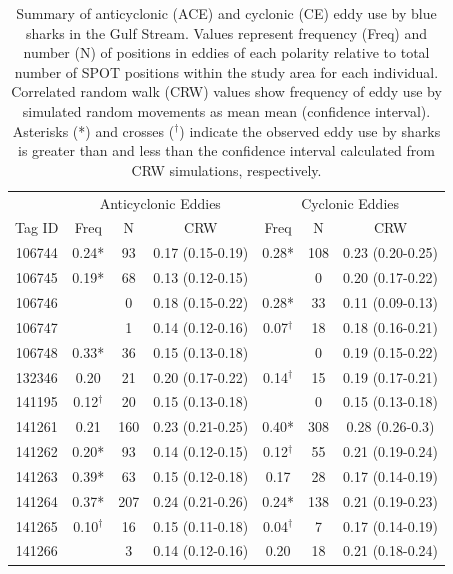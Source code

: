 \clearpage


\begin{table}
\caption[Summary of anticyclonic and cyclonic eddy use by blue sharks in the Gulf Stream]{Summary of anticyclonic (ACE) and cyclonic (CE) eddy use by blue sharks in the Gulf Stream. Values represent frequency (Freq) and number (N) of positions in eddies of each polarity relative to total number of SPOT positions within the study area for each individual. Correlated random walk (CRW) values show frequency of eddy use by simulated random movements as mean mean (confidence interval). Asterisks (*) and crosses ($^{\dagger}$) indicate the observed eddy use by sharks is greater than and less than the confidence interval calculated from CRW simulations, respectively.}
\label{tab:c5t2}
\centering
\begin{tabular}[t]{ccccccc}
\toprule
 & \multicolumn{3}{c}{Anticyclonic Eddies} & \multicolumn{3}{c}{Cyclonic Eddies} \\
Tag ID & Freq & N & CRW & Freq & N & CRW\\
\midrule
106744 & 0.24* & 93 & 0.17 (0.15-0.19) & 0.28* & 108 & 0.23 (0.20-0.25)\\
106745 & 0.19* & 68 & 0.13 (0.12-0.15) &  & 0 & 0.20 (0.17-0.22)\\
106746 &  & 0 & 0.18 (0.15-0.22) & 0.28* & 33 & 0.11 (0.09-0.13)\\
106747 &  & 1 & 0.14 (0.12-0.16) & 0.07$^{\dagger}$ & 18 & 0.18 (0.16-0.21)\\
106748 & 0.33* & 36 & 0.15 (0.13-0.18) &  & 0 & 0.19 (0.15-0.22)\\
132346 & 0.20 & 21 & 0.20 (0.17-0.22) & 0.14$^{\dagger}$ & 15 & 0.19 (0.17-0.21)\\
141195 & 0.12$^{\dagger}$ & 20 & 0.15 (0.13-0.18) &  & 0 & 0.15 (0.13-0.18)\\
141261 & 0.21 & 160 & 0.23 (0.21-0.25) & 0.40* & 308 & 0.28 (0.26-0.3)\\
141262 & 0.20* & 93 & 0.14 (0.12-0.15) & 0.12$^{\dagger}$ & 55 & 0.21 (0.19-0.24)\\
141263 & 0.39* & 63 & 0.15 (0.12-0.18) & 0.17 & 28 & 0.17 (0.14-0.19)\\
141264 & 0.37* & 207 & 0.24 (0.21-0.26) & 0.24* & 138 & 0.21 (0.19-0.23)\\
141265 & 0.10$^{\dagger}$ & 16 & 0.15 (0.11-0.18) & 0.04$^{\dagger}$ & 7 & 0.17 (0.14-0.19)\\
141266 &  & 3 & 0.14 (0.12-0.16) & 0.20 & 18 & 0.21 (0.18-0.24)\\

\end{tabular}
\end{table}
